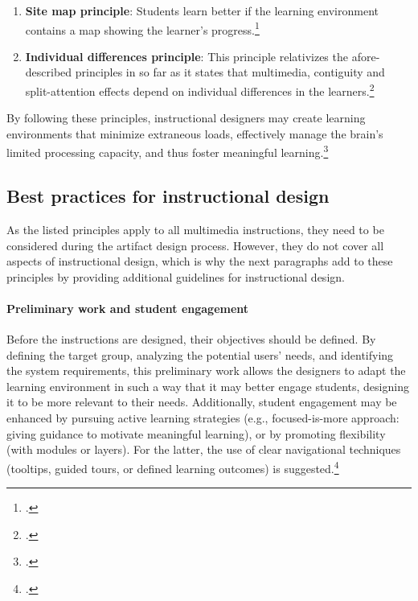 \begin{enumerate}
    \item \textbf{Site map principle}: Students learn better if the learning environment contains a map showing the learner's progress.\footcites[Cf.][p.7]{MayerMultimediaLearning2009}
  \item \textbf{Individual differences principle}: This principle relativizes the afore-described principles in so far as it states that multimedia, contiguity and split-attention effects depend on individual differences in the learners.\footcites[Cf.][p.15]{MayerCognitiveTheoryMultimedia1999}
\end{enumerate}
By following these principles, instructional designers may create learning environments that minimize extraneous loads, effectively manage the brain's limited processing capacity, and thus foster meaningful learning.\footcites[Cf.][chapter 2, paragraph 6]{ClarkElearningscienceinstruction2016}

\subsection{Best practices for instructional design} \label{subsec:BestPracticesDesign}
As the listed principles apply to all multimedia instructions, they need to be considered during the artifact design process. However, they do not cover all aspects of instructional design, which is why the next paragraphs add to these principles by providing additional guidelines for instructional design.

\paragraph{Preliminary work and student engagement} Before the instructions are designed, their objectives should be defined. By defining the target group, analyzing the potential users' needs, and identifying the system requirements, this preliminary work allows the designers to adapt the learning environment in such a way that it may better engage students, designing it to be more relevant to their needs. Additionally, student engagement may be enhanced by pursuing active learning strategies (e.g., focused-is-more approach: giving guidance to motivate meaningful learning), or by promoting flexibility (with modules or layers). For the latter, the use of clear navigational techniques (tooltips, guided tours, or defined learning outcomes) is suggested.\footcites[Cf.][p.202]{BlummerBestPracticesCreating2009}

